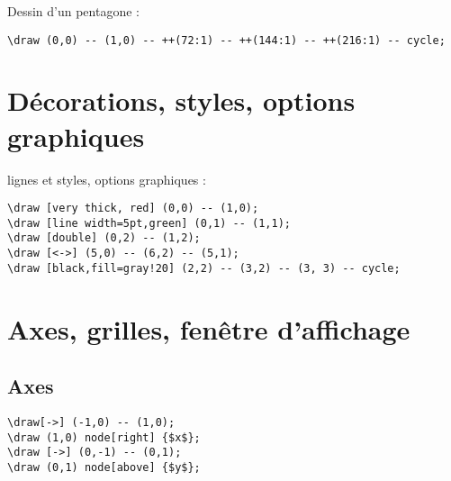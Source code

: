 \bigskip
Dessin d'un pentagone :
\begin{verbatim}
\draw (0,0) -- (1,0) -- ++(72:1) -- ++(144:1) -- ++(216:1) -- cycle;
\end{verbatim}



\newpage
\section{Décorations, styles, options graphiques}
lignes et styles, options graphiques :

\begin{verbatim}
\draw [very thick, red] (0,0) -- (1,0);
\draw [line width=5pt,green] (0,1) -- (1,1);
\draw [double] (0,2) -- (1,2);
\draw [<->] (5,0) -- (6,2) -- (5,1);
\draw [black,fill=gray!20] (2,2) -- (3,2) -- (3, 3) -- cycle;
\end{verbatim}





%



\newpage
\section{Axes, grilles, fenêtre d'affichage}

\subsection{Axes}
\begin{verbatim}
\draw[->] (-1,0) -- (1,0);
\draw (1,0) node[right] {$x$};
\draw [->] (0,-1) -- (0,1);
\draw (0,1) node[above] {$y$};
\end{verbatim}

